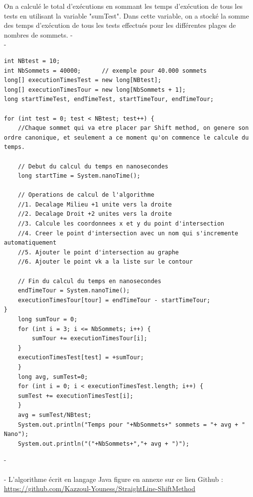 \documentclass[hidelinks,letterpaper,12pt]{article}
\begin{document}
On a calculé le total d'exécutions en sommant les temps d'exécution de tous les tests en utilisant la variable "sumTest".
Dans cette variable, on a stocké la somme des temps d'exécution de tous les tests effectués pour les différentes plages de nombres de sommets.
{\color{white}-}
\\
{\color{white}-}
\begin{lstlisting}[caption={Extrait de code représentant la Méthode utilisée pour le calcule des mesures.}, label={Extrait de code représentant la Méthode utilisée pour le calcule des mesures.}]
int NBtest = 10;
int NbSommets = 40000; 	    // exemple pour 40.000 sommets
long[] executionTimesTest = new long[NBtest];
long[] executionTimesTour = new long[NbSommets + 1];
long startTimeTest, endTimeTest, startTimeTour, endTimeTour;		

for (int test = 0; test < NBtest; test++) {
    //Chaque sommet qui va etre placer par Shift method, on genere son ordre canonique, et seulement a ce moment qu'on commence le calcule du temps. 
	
    // Debut du calcul du temps en nanosecondes
    long startTime = System.nanoTime();
	
    // Operations de calcul de l'algorithme
    //1. Decalage Milieu +1 unite vers la droite
    //2. Decalage Droit +2 unites vers la droite
    //3. Calcule les coordonnees x et y du point d'intersection
    //4. Creer le point d'intersection avec un nom qui s'incremente automatiquement
    //5. Ajouter le point d'intersection au graphe
    //6. Ajouter le point vk a la liste sur le contour   
	
    // Fin du calcul du temps en nanosecondes
    endTimeTour = System.nanoTime();
    executionTimesTour[tour] = endTimeTour - startTimeTour;
}	
    long sumTour = 0;
    for (int i = 3; i <= NbSommets; i++) {
        sumTour += executionTimesTour[i];
    }					
    executionTimesTest[test] = +sumTour;
    }		
    long avg, sumTest=0;
    for (int i = 0; i < executionTimesTest.length; i++) {
	sumTest += executionTimesTest[i];
    }
    avg = sumTest/NBtest;
    System.out.println("Temps pour "+NbSommets+" sommets = "+ avg + " Nano");
    System.out.println("("+NbSommets+","+ avg + ")");
\end{lstlisting}
{\color{white}-}
\\ \\
{\color{white}-}
L’algorithme écrit en langage Java figure en annexe sur ce lien Github : \\
\url{https://github.com/Kazzoul-Youness/StraightLine-ShiftMethod}
\end{document}

